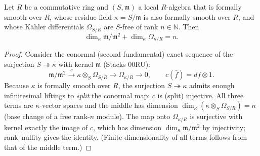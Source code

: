 \begin{theorem}
  \label{thm:conormal_dim_identity}
  \leanok
  Let \(R\) be a commutative ring and \((S, \mathfrak m)\) a local \(R\)-algebra that is
  formally smooth over \(R\), whose residue field \(\kappa = S/\mathfrak m\) is also
  formally smooth over \(R\), and whose K\"ahler differentials \(\Omega_{S/R}\) are
  \(S\)-free of rank \(n \in \mathbb{N}\). Then
  \[
    \dim_\kappa \mathfrak m/\mathfrak m^2 + \dim_\kappa \Omega_{\kappa/R} = n.
  \]
\end{theorem}
\begin{proof}
  \leanok
  Consider the conormal (second fundamental) exact sequence of the surjection
  \(S \twoheadrightarrow \kappa\) with kernel \(\mathfrak m\) (Stacks 00RU):
  \[
    \mathfrak m/\mathfrak m^2 \xrightarrow{\ c\ }
      \kappa \otimes_S \Omega_{S/R} \longrightarrow \Omega_{\kappa/R} \longrightarrow 0,
    \qquad c(\bar f) = df \otimes 1.
  \]
  Because \(\kappa\) is formally smooth over \(R\), the surjection
  \(S \twoheadrightarrow \kappa\) admits enough infinitesimal liftings to \emph{split}
  the conormal map: \(c\) is (split) injective. All three terms are
  \(\kappa\)-vector spaces and the middle has dimension
  \(\dim_\kappa (\kappa \otimes_S \Omega_{S/R}) = n\) (base change of a free rank-\(n\)
  module). The map onto \(\Omega_{\kappa/R}\) is surjective with kernel exactly the
  image of \(c\), which has dimension \(\dim_\kappa \mathfrak m/\mathfrak m^2\) by
  injectivity; rank--nullity gives the identity. (Finite-dimensionality of all terms
  follows from that of the middle term.)
\end{proof}

